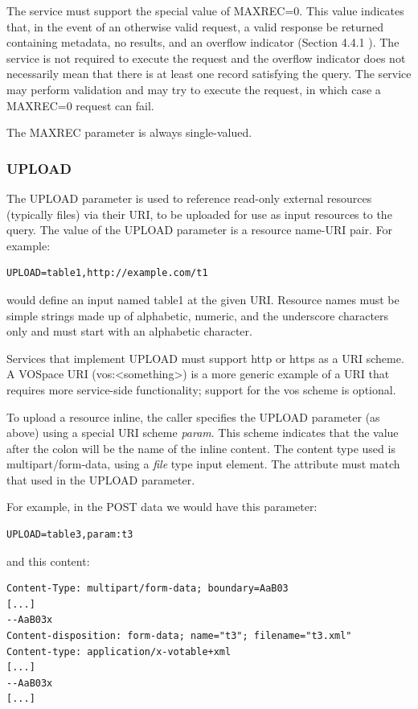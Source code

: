 \documentclass[11pt,letter]{ivoa}
\begin{document}
The service must support the special value of MAXREC=0. This value indicates
that, in the event of an otherwise valid request, a valid response be returned
containing metadata, no results, and an overflow indicator (Section 4.4.1 ). The
service is not required to execute the request and the overflow indicator does
not necessarily mean that there is at least one record satisfying the query. The
service may perform validation and may try to execute the request, in which case
a MAXREC=0 request can fail.

The MAXREC parameter is always single-valued.

\subsubsection{UPLOAD}
\label{sec:UPLOAD}
The UPLOAD parameter is used to reference read-only external resources
(typically files) via their URI, to be uploaded for use as input resources to
the query. The value of the UPLOAD parameter is a resource name-URI pair. For
example:

\begin{verbatim}
UPLOAD=table1,http://example.com/t1
\end{verbatim}

would define an input named table1 at the given URI. Resource names must be
simple strings made up of alphabetic, numeric, and the underscore characters
only and must start with an alphabetic character.

Services that implement UPLOAD must support http or https as a URI scheme.
A VOSpace URI (vos:<something>)  is a
more generic example of a URI that requires more service-side functionality;
support for the vos scheme is optional.

To upload a resource inline, the caller specifies the UPLOAD parameter (as
above) using a special URI scheme \emph{param}. This scheme indicates that the value
after the colon will be the name of the inline content. The content type used is
multipart/form-data, using a \emph{file} type input element. The  attribute
must match that used in the UPLOAD parameter.

For example, in the POST data we would have this parameter:

\begin{verbatim}
UPLOAD=table3,param:t3
\end{verbatim}

and this content:

\begin{verbatim}
Content-Type: multipart/form-data; boundary=AaB03
[...]
--AaB03x
Content-disposition: form-data; name="t3"; filename="t3.xml"
Content-type: application/x-votable+xml
[...]
--AaB03x
[...]
\end{verbatim}
\end{document}
